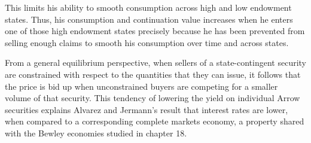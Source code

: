 This limits his ability to smooth consumption across high and low endowment
states.
Thus, his consumption and continuation
value increases when  he enters one of those high endowment states
precisely because he has been prevented from selling enough
claims to smooth his consumption over time and across states.


From a general equilibrium perspective, when sellers of a state-contingent security are constrained with respect to the quantities that they can issue, it follows that the price is bid up when unconstrained buyers are competing for a smaller volume of that security. This tendency of lowering the yield on individual Arrow securities explains Alvarez and Jermann's result that interest rates are \newpage \noindent lower, when compared to a corresponding complete markets economy, a property shared with the Bewley economies studied in chapter 18.



